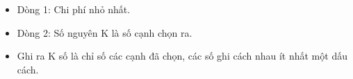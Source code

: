 \begin{itemize}
	\item Dòng 1: Chi phí nhỏ nhất.
	\item Dòng 2: Số nguyên K là số cạnh chọn ra.
	\item Ghi ra K số là chỉ số các cạnh đã chọn, các số ghi cách nhau ít nhất một dấu cách.
\end{itemize}